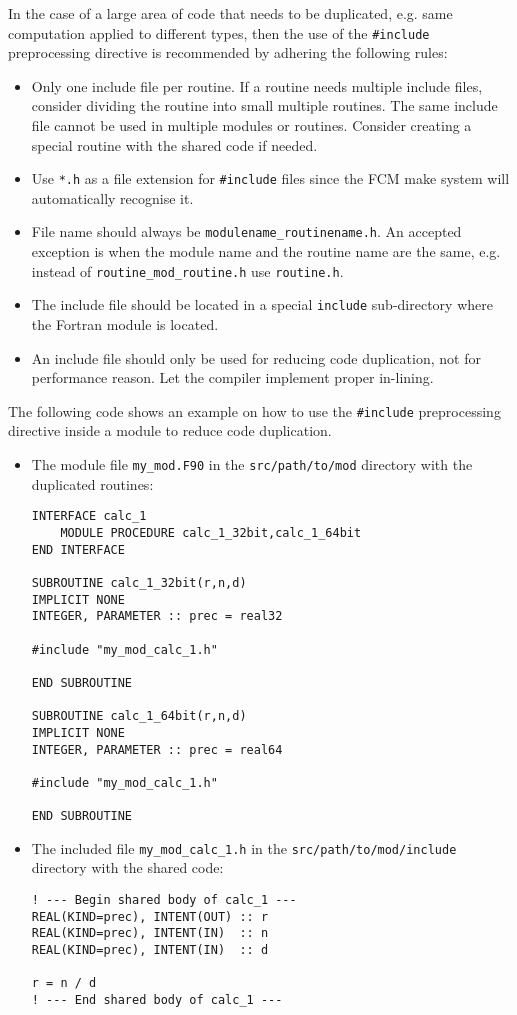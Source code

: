 In the case of a large area of code that needs to be duplicated, e.g. same
computation applied to different types, then the use of the \verb|#include|
preprocessing directive is recommended by adhering the following rules:

\begin{itemize}
\item Only one include file per routine. If a routine needs multiple
  include files, consider dividing the routine into small multiple
  routines. The same include file cannot be used in multiple modules or routines.
  Consider creating a special routine with the shared code if needed.
\item Use \verb|*.h| as a file extension for \verb|#include|
  files since the FCM make system will automatically recognise it.
\item File name should always be \verb|modulename_routinename.h|. An
  accepted exception is when the module name and the
  routine name are the same, e.g. instead
  of \verb|routine_mod_routine.h| use \verb|routine.h|.
\item The include file should be located in a special \verb|include| sub-directory where the Fortran module is located.
\item An include file should only be used for reducing code
  duplication, not for performance reason. Let the compiler implement
  proper in-lining.
\end{itemize}

The following code shows an example on how to use the \verb|#include|
preprocessing directive inside a module to reduce code duplication.

\begin{itemize}
  \item The module file \verb|my_mod.F90| in the \verb|src/path/to/mod| directory with the duplicated routines:
  \begin{verbatim}
INTERFACE calc_1
    MODULE PROCEDURE calc_1_32bit,calc_1_64bit
END INTERFACE

SUBROUTINE calc_1_32bit(r,n,d)
IMPLICIT NONE
INTEGER, PARAMETER :: prec = real32

#include "my_mod_calc_1.h"

END SUBROUTINE

SUBROUTINE calc_1_64bit(r,n,d)
IMPLICIT NONE
INTEGER, PARAMETER :: prec = real64

#include "my_mod_calc_1.h"

END SUBROUTINE
  \end{verbatim}

  \item The included file \verb|my_mod_calc_1.h| in the
    \verb|src/path/to/mod/include| directory with the shared code:
  \begin{verbatim}
! --- Begin shared body of calc_1 ---
REAL(KIND=prec), INTENT(OUT) :: r
REAL(KIND=prec), INTENT(IN)  :: n
REAL(KIND=prec), INTENT(IN)  :: d

r = n / d
! --- End shared body of calc_1 ---
  \end{verbatim}
\end{itemize}

